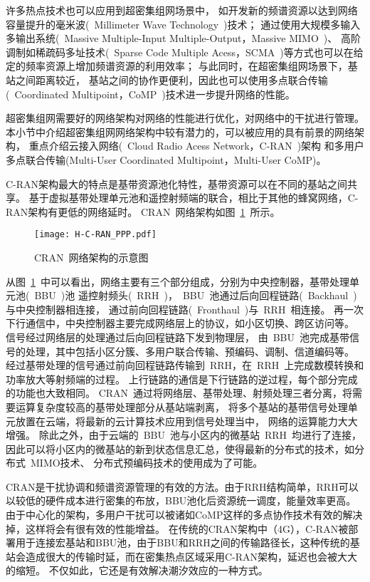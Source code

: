 许多热点技术也可以应用到超密集组网场景中，
如开发新的频谱资源以达到网络容量提升的毫米波(~Millimeter Wave Technology~)技术；
通过使用大规模多输入多输出系统(~Massive Multiple-Input Multiple-Output，Massive MIMO~)、
高阶调制如稀疏码多址技术(~Sparse Code Multiple Acess，SCMA~)等方式也可以在给定的频率资源上增加频谱资源的利用效率；
与此同时，在超密集组网场景下，基站之间距离较近，
基站之间的协作更便利，因此也可以使用多点联合传输(~Coordinated Multipoint，CoMP~)技术进一步提升网络的性能。

超密集组网需要好的网络架构对网络的性能进行优化，对网络中的干扰进行管理。
本小节中介绍超密集组网网络架构中较有潜力的，可以被应用的具有前景的网络架构，
重点介绍云接入网络(~Cloud Radio Acess Network，C-RAN~)架构
和多用户多点联合传输(Multi-User Coordinated Multipoint，Multi-User CoMP)。

C-RAN架构最大的特点是基带资源池化特性，基带资源可以在不同的基站之间共享。
基于虚拟基带处理单元池和遥控射频端的联合，相比于其他的蜂窝网络，C-RAN架构有更低的网络延时。
CRAN~网络架构如图~\ref{CRAN}~所示。
\begin{figure}[htbp]
\centering
\texttt{[image: H-C-RAN\_PPP.pdf]}
\caption{CRAN~网络架构的示意图}\vspace{-1.5em}
\label{CRAN}
\end{figure}
从图~\ref{CRAN}~中可以看出，网络主要有三个部分组成，分别为中央控制器，基带处理单元池(~BBU~)池
遥控射频头(~RRH~)，~BBU~池通过后向回程链路(~Backhaul~)与中央控制器相连接，
通过前向回程链路(~Fronthaul~)与~RRH~相连接。
再一次下行通信中，中央控制器主要完成网络层上的协议，如小区切换、跨区访问等。
信号经过网络层的处理通过后向回程链路下发到物理层，
由~BBU~池完成基带信号的处理，其中包括小区分簇、多用户联合传输、预编码、调制、信道编码等。
经过基带处理的信号通过前向回程链路传输到~RRH，在~RRH~上完成数模转换和功率放大等射频端的过程。
上行链路的通信是下行链路的逆过程，每个部分完成的功能也大致相同。
CRAN~通过将网络层、基带处理、射频处理三者分离，将需要运算复杂度较高的基带处理部分从基站端剥离，
将多个基站的基带信号处理单元放置在云端，将最新的云计算技术应用到信号处理当中，
网络的运算能力大大增强。
除此之外，由于云端的~BBU~池与小区内的微基站~RRH~均进行了连接，
因此可以将小区内的微基站的新到状态信息汇总，使得最新的分布式的技术，如分布式~MIMO技术、
分布式预编码技术的使用成为了可能。

CRAN是干扰协调和频谱资源管理的有效的方法。由于RRH结构简单，RRH可以以较低的硬件成本进行密集的布放，BBU池化后资源统一调度，能量效率更高。
由于中心化的架构，多用户干扰可以被诸如CoMP这样的多点协作技术有效的解决掉，这样将会有很有效的性能增益。
在传统的CRAN架构中（4G），C-RAN被部署用于连接宏基站和BBU池，由于BBU和RRH之间的传输路径长，这种传统的基站会造成很大的传输时延，而在密集热点区域采用C-RAN架构，延迟也会被大大的缩短。
不仅如此，它还是有效解决潮汐效应的一种方式。

